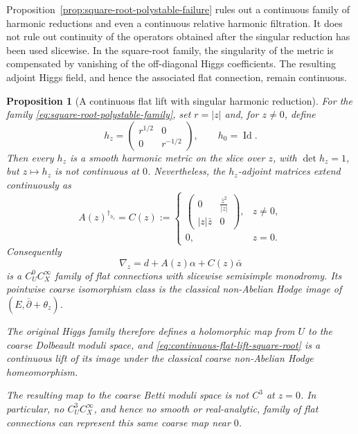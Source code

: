 \documentclass[11pt,reqno]{amsart}
\newtheorem{proposition}[theorem]{Proposition}
\theoremstyle{definition}
\theoremstyle{remark}
\newcommand{\Id}{\operatorname{Id}}
\newcommand{\ddbar}{\overline\partial}
\begin{document}
Proposition~\ref{prop:square-root-polystable-failure} rules out a continuous family of harmonic reductions and even a continuous relative harmonic filtration.  It does not rule out continuity of the operators obtained after the singular reduction has been used slicewise.  In the square-root family, the singularity of the metric is compensated by vanishing of the off-diagonal Higgs coefficients.  The resulting adjoint Higgs field, and hence the associated flat connection, remain continuous.

\begin{proposition}[A continuous flat lift with singular harmonic reduction]\label{prop:weak-flat-lift-square-root}
For the family \eqref{eq:square-root-polystable-family}, set $r=|z|$ and, for $z\ne0$, define
\begin{equation}\label{eq:singular-harmonic-metric-square-root}
  h_z=
  \begin{pmatrix}
    r^{1/2}&0\\
    0&r^{-1/2}
  \end{pmatrix},
  \qquad h_0=\Id.
\end{equation}
Then every $h_z$ is a smooth harmonic metric on the slice over $z$, with $\det h_z=1$, but $z\mapsto h_z$ is not continuous at $0$.  Nevertheless, the $h_z$-adjoint matrices extend continuously as
\begin{equation}\label{eq:continuous-adjoint-square-root}
  A(z)^{\dagger_{h_z}}
  =C(z)
  :=
  \begin{cases}
  \begin{pmatrix}
    0&\displaystyle\frac{\bar z^2}{|z|}\\[5pt]
    |z|\bar z&0
  \end{pmatrix},&z\ne0,\\[14pt]
  0,&z=0.
  \end{cases}
\end{equation}
Consequently
\begin{equation}\label{eq:continuous-flat-lift-square-root}
  \nabla_z=d+A(z)\alpha+C(z)\bar\alpha
\end{equation}
is a $C^0_UC^\infty_X$ family of flat connections with slicewise semisimple monodromy.  Its pointwise coarse isomorphism class is the classical non-Abelian Hodge image of $(E,\ddbar+\theta_z)$.

The original Higgs family therefore defines a holomorphic map from $U$ to the coarse Dolbeault moduli space, and \eqref{eq:continuous-flat-lift-square-root} is a continuous lift of its image under the classical coarse non-Abelian Hodge homeomorphism.

The resulting map to the coarse Betti moduli space is not $C^3$ at $z=0$.  In particular, no $C^3_UC^\infty_X$, and hence no smooth or real-analytic, family of flat connections can represent this same coarse map near $0$.
\end{proposition}
\end{document}
